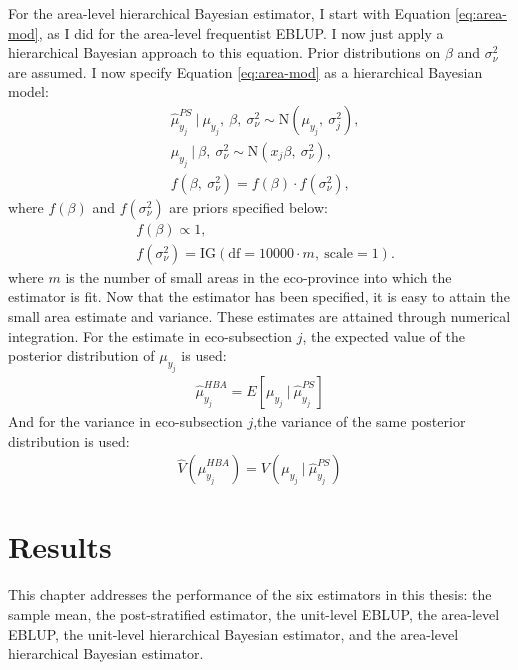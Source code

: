 \documentclass[12pt,twoside]{reedthesis}
\begin{document}
For the area-level hierarchical Bayesian estimator, I start with Equation \eqref{eq:area-mod}, as I did for the area-level frequentist EBLUP. I now just apply a hierarchical Bayesian approach to this equation. Prior distributions on \(\beta\) and \(\sigma^2_\nu\) are assumed. I now specify Equation \eqref{eq:area-mod} as a hierarchical Bayesian model:
\begin{align}
&\hat\mu_{y_j}^{PS} ~\vert~ \mu_{y_j},~ \beta,~ \sigma^2_\nu \sim \text{N}(\mu_{y_j},~ \sigma^2_j), \nonumber \\
&\mu_{y_j} ~\vert~ \beta,~ \sigma^2_\nu \sim \text{N}(x_j\beta,~ \sigma^2_\nu),\nonumber \\
&f(\beta,~ \sigma^2_\nu) = f(\beta)\cdot f(\sigma^2_\nu),
\end{align}
where \(f(\beta)\) and \(f(\sigma^2_\nu)\) are priors specified below:
\begin{align*}
&f(\beta) \propto 1, \\
&f(\sigma^2_\nu) = \text{IG}(\text{df} = 10000 \cdot m,~ \text{scale} = 1).
\end{align*}
where \(m\) is the number of small areas in the eco-province into which the estimator is fit. Now that the estimator has been specified, it is easy to attain the small area estimate and variance. These estimates are attained through numerical integration. For the estimate in eco-subsection \(j\), the expected value of the posterior distribution of \(\mu_{y_j}\) is used:
\begin{align}
\hat\mu_{y_j}^{HBA} = E[\mu_{y_j} ~\vert~ \hat\mu_{y_j}^{PS}] 
\end{align}
And for the variance in eco-subsection \(j\),the variance of the same posterior distribution is used:
\begin{align}
\hat V(\hat\mu_{y_j}^{HBA}) = V(\mu_{y_j} ~\vert~ \hat\mu_{y_j}^{PS})
\end{align}
\hypertarget{results}{%
\chapter{Results}\label{results}}

This chapter addresses the performance of the six estimators in this thesis: the sample mean, the post-stratified estimator, the unit-level EBLUP, the area-level EBLUP, the unit-level hierarchical Bayesian estimator, and the area-level hierarchical Bayesian estimator.
\end{document}
